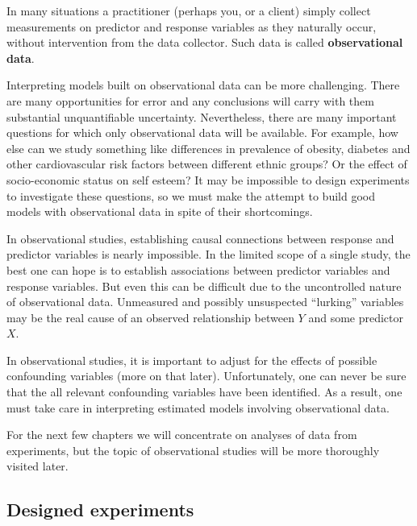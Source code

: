 \documentclass[
]{book}
\begin{document}
In many situations a practitioner (perhaps you, or a client) simply collect measurements on predictor and response variables as they naturally occur, without intervention from the data collector.
Such data is called \textbf{observational data}.

Interpreting models built on observational data can be more challenging.
There are many opportunities for error and any conclusions will carry with them substantial unquantifiable uncertainty.
Nevertheless, there are many important questions for which only observational data will be available.
For example, how else can we study something like differences in prevalence of obesity, diabetes and other cardiovascular risk factors between different ethnic groups?
Or the effect of socio-economic status on self esteem?
It may be impossible to design experiments to investigate these questions, so we must make the attempt to build good models with observational data in spite of their shortcomings.

In observational studies, establishing causal connections between response and predictor variables is nearly impossible.
In the limited scope of a single study, the best one can hope is to establish associations between predictor variables and response variables.
But even this can be difficult due to the uncontrolled nature of observational data.
Unmeasured and possibly unsuspected ``lurking'' variables may be the real cause of an observed relationship between \(Y\) and some predictor \(X\).

In observational studies, it is important to adjust for the effects of possible confounding variables (more on that later).
Unfortunately, one can never be sure that the all relevant confounding variables have been identified.
As a result, one must take care in interpreting estimated models involving observational data.

For the next few chapters we will concentrate on analyses of data from experiments, but the topic of observational studies will be more thoroughly visited later.

\hypertarget{designed-experiments}{%
\subsection{Designed experiments}\label{designed-experiments}}
\end{document}
